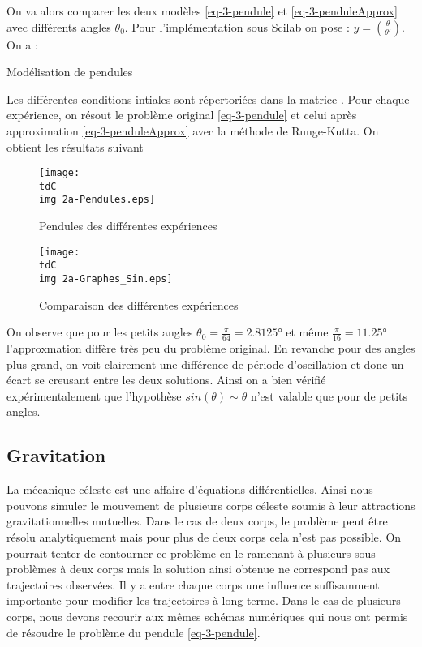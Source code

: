		On va alors comparer les deux modèles \eqref{eq-3-pendule} et \eqref{eq-3-penduleApprox} avec différents angles $\theta_0$.
		Pour l'implémentation sous Scilab on pose : $y = \binom{\theta}{\theta'}$. On a :
		\begin{listing}[H]
			\caption{Modélisation de pendules}
			\label{code-3-pendules}
		\end{listing}

		Les différentes conditions intiales sont répertoriées dans la matrice . Pour chaque expérience, on résout le problème original \eqref{eq-3-pendule} et celui après approximation \eqref{eq-3-penduleApprox} avec la méthode de Runge-Kutta. On obtient les résultats suivant

		\begin{figure}[H]
			\centering
			\texttt{[image: \\tdC\\img 2a-Pendules.eps]}
			\caption{Pendules des différentes expériences}
			\label{img-3-pendules}
		\end{figure}
		\begin{figure}[H]
			\centering
			\texttt{[image: \\tdC\\img 2a-Graphes\_Sin.eps]}
			\caption{Comparaison des différentes expériences}
			\label{img-3-compPendules}
		\end{figure}

		On observe que pour les petits angles $\theta_0 = \frac{\pi}{64} = 2.8125$° et même $\frac{\pi}{16} = 11.25$° l'approxmation diffère très peu du problème original. En revanche pour des angles plus grand, on voit clairement une différence de période d'oscillation et donc un écart se creusant entre les deux solutions. Ainsi on a bien vérifié expérimentalement que l'hypothèse $sin(\theta) \sim \theta$ n'est valable que pour de petits angles. 


	\subsection{Gravitation}

		La mécanique céleste est une affaire d'équations différentielles.
		Ainsi nous pouvons simuler le mouvement de plusieurs corps céleste soumis à leur attractions gravitationnelles mutuelles.
		Dans le cas de deux corps, le problème peut être résolu analytiquement mais pour plus de deux corps cela n'est pas possible. On pourrait tenter de contourner ce problème en le ramenant à plusieurs sous-problèmes à deux corps mais la solution ainsi obtenue ne correspond pas aux trajectoires observées. Il y a entre chaque corps une influence suffisamment importante pour modifier les trajectoires à long terme.
		Dans le cas de plusieurs corps, nous devons recourir aux mêmes schémas numériques qui nous ont permis de résoudre le problème du pendule \eqref{eq-3-pendule}.

